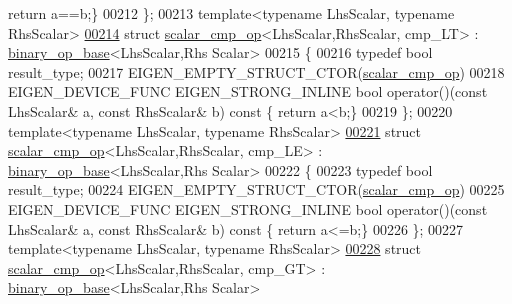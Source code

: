 \begin{DoxyCode}
{      return} a==b;\}
00212 \};
00213 \textcolor{keyword}{template}<\textcolor{keyword}{typename} LhsScalar, \textcolor{keyword}{typename} RhsScalar>
\hyperlink{struct_eigen_1_1internal_1_1scalar__cmp__op_3_01_lhs_scalar_00_01_rhs_scalar_00_01cmp___l_t_01_4}{00214} \textcolor{keyword}{struct }\hyperlink{struct_eigen_1_1internal_1_1scalar__cmp__op}{scalar\_cmp\_op}<LhsScalar,RhsScalar, cmp\_LT> : \hyperlink{struct_eigen_1_1internal_1_1binary__op__base}{binary\_op\_base}<LhsScalar,Rhs
      Scalar>
00215 \{
00216   \textcolor{keyword}{typedef} \textcolor{keywordtype}{bool} result\_type;
00217   EIGEN\_EMPTY\_STRUCT\_CTOR(\hyperlink{struct_eigen_1_1internal_1_1scalar__cmp__op}{scalar\_cmp\_op})
00218   EIGEN\_DEVICE\_FUNC EIGEN\_STRONG\_INLINE \textcolor{keywordtype}{bool} operator()(\textcolor{keyword}{const} LhsScalar& a, \textcolor{keyword}{const} RhsScalar& b)\textcolor{keyword}{ const }\{\textcolor{keywordflow}{
      return} a<b;\}
00219 \};
00220 \textcolor{keyword}{template}<\textcolor{keyword}{typename} LhsScalar, \textcolor{keyword}{typename} RhsScalar>
\hyperlink{struct_eigen_1_1internal_1_1scalar__cmp__op_3_01_lhs_scalar_00_01_rhs_scalar_00_01cmp___l_e_01_4}{00221} \textcolor{keyword}{struct }\hyperlink{struct_eigen_1_1internal_1_1scalar__cmp__op}{scalar\_cmp\_op}<LhsScalar,RhsScalar, cmp\_LE> : \hyperlink{struct_eigen_1_1internal_1_1binary__op__base}{binary\_op\_base}<LhsScalar,Rhs
      Scalar>
00222 \{
00223   \textcolor{keyword}{typedef} \textcolor{keywordtype}{bool} result\_type;
00224   EIGEN\_EMPTY\_STRUCT\_CTOR(\hyperlink{struct_eigen_1_1internal_1_1scalar__cmp__op}{scalar\_cmp\_op})
00225   EIGEN\_DEVICE\_FUNC EIGEN\_STRONG\_INLINE \textcolor{keywordtype}{bool} operator()(\textcolor{keyword}{const} LhsScalar& a, \textcolor{keyword}{const} RhsScalar& b)\textcolor{keyword}{ const }\{\textcolor{keywordflow}{
      return} a<=b;\}
00226 \};
00227 \textcolor{keyword}{template}<\textcolor{keyword}{typename} LhsScalar, \textcolor{keyword}{typename} RhsScalar>
\hyperlink{struct_eigen_1_1internal_1_1scalar__cmp__op_3_01_lhs_scalar_00_01_rhs_scalar_00_01cmp___g_t_01_4}{00228} \textcolor{keyword}{struct }\hyperlink{struct_eigen_1_1internal_1_1scalar__cmp__op}{scalar\_cmp\_op}<LhsScalar,RhsScalar, cmp\_GT> : \hyperlink{struct_eigen_1_1internal_1_1binary__op__base}{binary\_op\_base}<LhsScalar,Rhs
      Scalar>

\end{DoxyCode}
